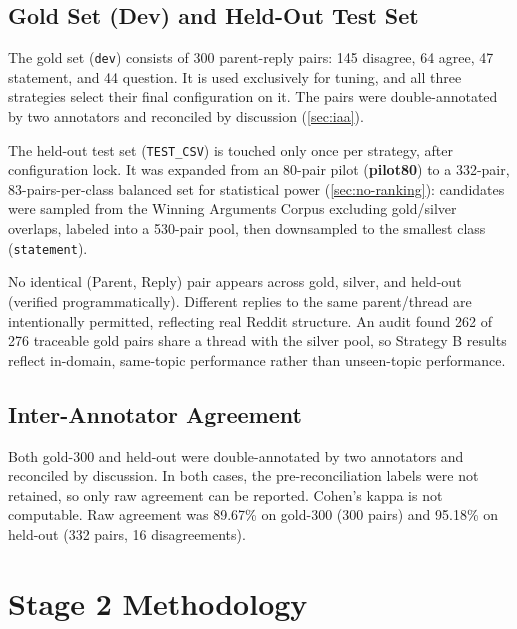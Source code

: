 \subsection{Gold Set (Dev) and Held-Out Test Set}
\label{sec:data}

The gold set (\texttt{dev}) consists of 300 parent-reply pairs: 145
disagree, 64 agree, 47 statement, and 44 question. It is used exclusively
for tuning, and all three strategies select their final configuration on
it. The pairs were double-annotated by two annotators and reconciled by
discussion (\autoref{sec:iaa}).

The held-out test set (\texttt{TEST\_CSV}) is touched only once per
strategy, after configuration lock. It was expanded from an 80-pair pilot
(\textbf{pilot80}) to a 332-pair, 83-pairs-per-class balanced set for
statistical power (\autoref{sec:no-ranking}): candidates were sampled
from the Winning Arguments Corpus excluding gold/silver overlaps, labeled
into a 530-pair pool, then downsampled to the smallest class
(\texttt{statement}).

No identical (Parent, Reply) pair appears across gold, silver, and
held-out (verified programmatically). Different replies to the same
parent/thread are intentionally permitted, reflecting real Reddit
structure. An audit found 262 of 276 traceable gold pairs share a thread
with the silver pool, so Strategy B results reflect in-domain, same-topic
performance rather than unseen-topic performance.

\subsection{Inter-Annotator Agreement}
\label{sec:iaa}

Both gold-300 and held-out were double-annotated by two annotators and
reconciled by discussion. In both cases, the pre-reconciliation labels
were not retained, so only raw agreement can be reported. Cohen's kappa is
not computable. Raw agreement was 89.67\% on gold-300 (300 pairs) and
95.18\% on held-out (332 pairs, 16 disagreements).

\section{Stage 2 Methodology}



